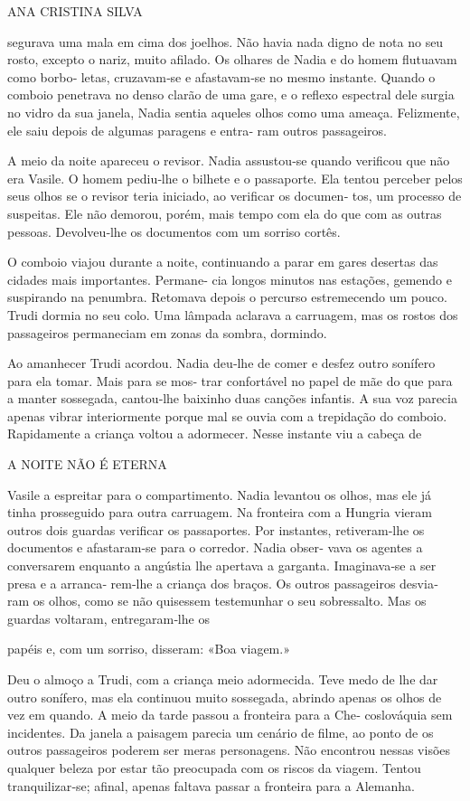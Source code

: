 ANA CRISTINA SILVA

segurava uma mala em cima dos joelhos. Não havia nada digno de nota no
seu rosto, excepto o nariz, muito afilado. Os olhares de Nadia e do
homem flutuavam como borbo‑ letas, cruzavam‑se e afastavam‑se no mesmo
instante. Quando o comboio penetrava no denso clarão de uma gare, e o
reflexo espectral dele surgia no vidro da sua janela, Nadia sentia
aqueles olhos como uma ameaça. Felizmente, ele saiu depois de algumas
paragens e entra‑ ram outros passageiros.

A meio da noite apareceu o revisor. Nadia assustou‑se quando verificou
que não era Vasile. O homem pediu‑lhe o bilhete e o passaporte. Ela
tentou perceber pelos seus olhos se o revisor teria iniciado, ao
verificar os documen‑ tos, um processo de suspeitas. Ele não demorou,
porém, mais tempo com ela do que com as outras pessoas. Devolveu‑lhe os
documentos com um sorriso cortês.

O comboio viajou durante a noite, continuando a parar em gares desertas
das cidades mais importantes. Permane‑ cia longos minutos nas estações,
gemendo e suspirando na penumbra. Retomava depois o percurso
estremecendo um pouco. Trudi dormia no seu colo. Uma lâmpada aclarava a
carruagem, mas os rostos dos passageiros permaneciam em zonas da sombra,
dormindo.

Ao amanhecer Trudi acordou. Nadia deu‑lhe de comer e desfez outro
sonífero para ela tomar. Mais para se mos‑ trar confortável no papel de
mãe do que para a manter sossegada, cantou‑lhe baixinho duas canções
infantis. A sua voz parecia apenas vibrar interiormente porque mal se
ouvia com a trepidação do comboio. Rapidamente a criança voltou a
adormecer. Nesse instante viu a cabeça de

A NOITE NÃO É ETERNA

Vasile a espreitar para o compartimento. Nadia levantou os olhos, mas
ele já tinha prosseguido para outra carruagem. Na fronteira com a
Hungria vieram outros dois guardas verificar os passaportes. Por
instantes, retiveram‑lhe os documentos e afastaram‑se para o corredor.
Nadia obser‑ vava os agentes a conversarem enquanto a angústia lhe
apertava a garganta. Imaginava‑se a ser presa e a arranca‑ rem‑lhe a
criança dos braços. Os outros passageiros desvia‑ ram os olhos, como se
não quisessem testemunhar o seu sobressalto. Mas os guardas voltaram,
entregaram‑lhe os

papéis e, com um sorriso, disseram: «Boa viagem.»

Deu o almoço a Trudi, com a criança meio adormecida. Teve medo de lhe
dar outro sonífero, mas ela continuou muito sossegada, abrindo apenas os
olhos de vez em quando. A meio da tarde passou a fronteira para a Che‑
coslováquia sem incidentes. Da janela a paisagem parecia um cenário de
filme, ao ponto de os outros passageiros poderem ser meras personagens.
Não encontrou nessas visões qualquer beleza por estar tão preocupada com
os riscos da viagem. Tentou tranquilizar‑se; afinal, apenas faltava
passar a fronteira para a Alemanha.

